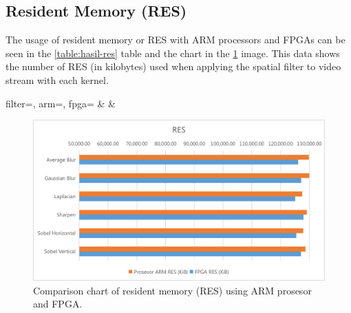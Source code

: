 \subsection{Resident Memory (RES)}


The usage of resident memory or RES with ARM processors and FPGAs can be seen in the \ref{table:hasil-res} table and the chart in the \ref{fig:chart-res} image. This data shows the number of RES (in kilobytes) used when applying the spatial filter to video stream with each kernel.

\begin{atable}
    \caption{Comparison table of resident memory (RES) using ARM prosesor and FPGA.}
    \label{table:hasil-res}
        {
            filter=\filter, 
            arm=\arm, 
            fpga=\fpga}
        {
            \filter & 
            \arm & 
            \fpga }
\end{atable}
\begin{figure}[H]
    \includegraphics[width=0.81\linewidth, center]{images/chart/chart-res.png}
    \caption{Comparison chart of resident memory (RES) using ARM prosesor and FPGA.}
    \label{fig:chart-res}
\end{figure}


